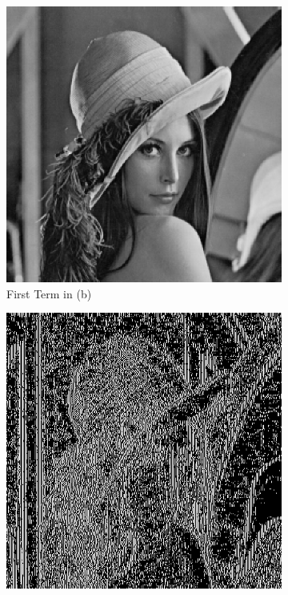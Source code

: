 \begin{figure}[H]
    \centering
    \caption{Result Images of (c)}
    \begin{subfigure}[b]{0.45\textwidth}
        \centering
        \includegraphics[width=\textwidth]{problem3/term1.bmp}
        \caption{First Term in (b)}
    \end{subfigure}
    \hfill
    \begin{subfigure}[b]{0.45\textwidth}
        \centering
        \includegraphics[width=\textwidth]{problem3/term2.bmp}

\end{subfigure}
\end{figure}
